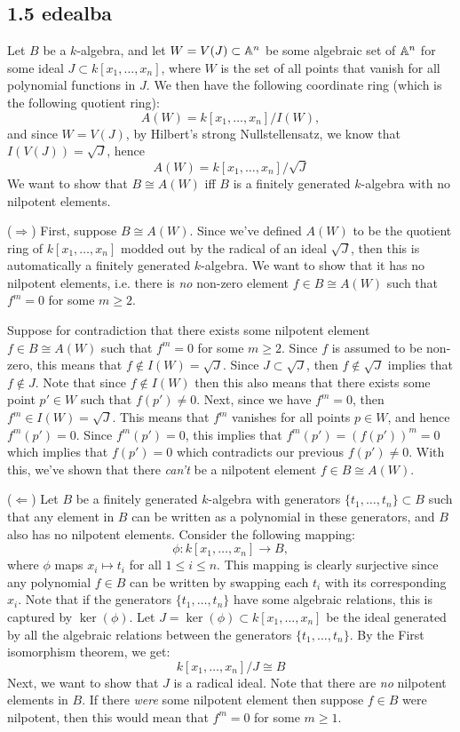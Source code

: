   \subsection*{1.5   {edealba}}

  Let $B$ be a $k$-algebra, and let $W = V(J) \subset \mathbb{A}^n$ be some algebraic set of $\mathbb{A}^n$ for some ideal $J \subset k[x_1, \ldots, x_n]$, where $W$ is the set of all points that vanish for all polynomial functions in $J$. We then have the following coordinate ring (which is the following quotient ring):
$$ A(W) = k[x_1, \ldots, x_n] / I(W),$$
and since $W = V(J)$, by Hilbert's strong Nullstellensatz, we know that $I(V(J)) = \sqrt{J}$, hence
$$ A(W) = k[x_1, \ldots, x_n] / \sqrt{J} $$
We want to show that $B \cong A(W)$ iff $B$ is a finitely generated $k$-algebra with no nilpotent elements.

($\Rightarrow$) First, suppose $B \cong A(W)$. Since we've defined $A(W)$ to be the quotient ring of $k[x_1, \ldots, x_n]$ modded out by the radical of an ideal $\sqrt{J}$, then this is automatically a finitely generated $k$-algebra. We want to show that it has no nilpotent elements, i.e. there is \emph{no} non-zero element $f \in B \cong A(W)$ such that $f^m = 0$ for some $m \geq 2$.

Suppose for contradiction that there exists some nilpotent element $f \in B \cong A(W)$ such that $f^m = 0$ for some $m \geq 2$. Since $f$ is assumed to be non-zero, this means that $f \notin I(W) = \sqrt{J}$. Since $J \subset \sqrt{J}$, then $f \notin \sqrt{J}$ implies that $f \notin J$. Note that since $f \notin I(W)$ then this also means that there exists some point $p' \in W$ such that $f(p') \neq 0$. Next, since we have $f^m = 0$, then $f^m \in I(W) = \sqrt{J}$. This means that $f^m$ vanishes for all points $p \in W$, and hence $f^m(p') = 0$. Since $f^m(p') = 0$, this implies that $f^m(p') = (f(p'))^m = 0$ which implies that $f(p') =0$ which contradicts our previous $f(p') \neq 0$. With this, we've shown that there \emph{can't} be a nilpotent element $f \in B \cong A(W)$.

($\Leftarrow$) Let $B$ be a finitely generated $k$-algebra with generators $\{ t_1, \ldots, t_n \} \subset B$ such that any element in $B$ can be written as a polynomial in these generators, and $B$ also has no nilpotent elements. Consider the following mapping:
$$ \phi: k[x_1, \ldots, x_n] \to B, $$
where $\phi$ maps $x_i \mapsto t_i$ for all $1\leq i \leq n$. This mapping is clearly surjective since any polynomial $f \in B$ can be written by swapping each $t_i$ with its corresponding $x_i$. Note that if the generators $\{t_1, \ldots, t_n \}$ have some algebraic relations, this is captured by $\ker(\phi)$. Let $J = \ker(\phi) \subset k[x_1, \ldots, x_n]$ be the ideal generated by all the algebraic relations between the generators $\{ t_1, \ldots, t_n \}$. By the First isomorphism theorem, we get:
$$ k[x_1, \ldots, x_n]/J \cong B$$
Next, we want to show that $J$ is a radical ideal. Note that there are \emph{no} nilpotent elements in $B$. If there \emph{were} some nilpotent element then suppose $f \in B$ were nilpotent, then this would mean that $f^m = 0$ for some $m\geq 1$.

